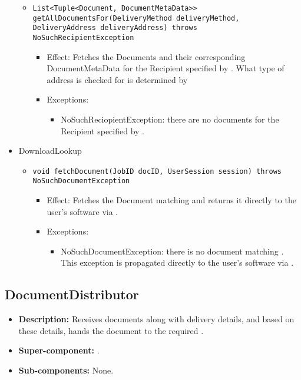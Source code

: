 \begin{itemize}
\begin{itemize}
		\item \texttt{List<Tuple<Document, DocumentMetaData>> getAllDocumentsFor(DeliveryMethod deliveryMethod, DeliveryAddress deliveryAddress) throws NoSuchRecipientException}
		\begin{itemize}
			\item Effect: Fetches the Documents and their corresponding DocumentMetaData for the Recipient specified by . What type of address is checked for is determined by 
			\item Exceptions: 
			\begin{itemize}
				\item NoSuchReciopientException: there are no documents for the Recipient specified by .
			\end{itemize}
		\end{itemize}
	\end{itemize}

    \item DownloadLookup
	\begin{itemize}
		\item \texttt{void fetchDocument(JobID docID, UserSession session) throws NoSuchDocumentException}
		\begin{itemize}
			\item Effect: Fetches the Document matching  and returns it directly to the user's software via .
			\item Exceptions:
			\begin{itemize}
				\item NoSuchDocumentException: there is no document matching . This exception is propagated directly to the user's software via .
			\end{itemize}
		\end{itemize}
	\end{itemize}
\end{itemize}

\subsection{DocumentDistributor}
\begin{itemize}
    \item \textbf{Description:} Receives documents along with delivery details, and based on these details, hands the document to the required .
    \item \textbf{Super-component:} .
    \item \textbf{Sub-components:} None.
\end{itemize}

